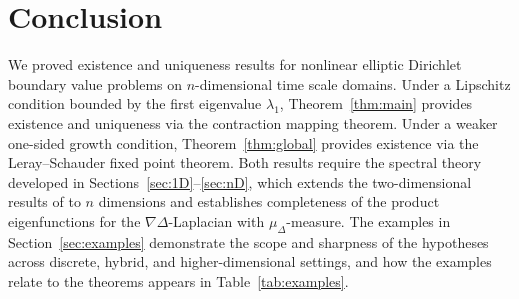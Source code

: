 \documentclass{article}
\numberwithin{equation}{section}
\numberwithin{theorem}{section}
\begin{document}

\section{Conclusion}
\label{sec:conclusion}
We proved existence and uniqueness results for nonlinear elliptic Dirichlet boundary value problems on $n$-dimensional time scale domains.
Under a Lipschitz condition bounded by the first eigenvalue $\lambda_1$, Theorem~\ref{thm:main} provides existence and uniqueness via the contraction mapping theorem. Under a weaker one-sided growth condition, Theorem~\ref{thm:global} provides existence via the Leray--Schauder fixed point theorem. Both results require the spectral theory developed in Sections~\ref{sec:1D}--\ref{sec:nD}, which extends the two-dimensional results of \cite{Huseynov-2009} to $n$ dimensions and establishes completeness of the product eigenfunctions for the $\nabla\Delta$-Laplacian with $\mu_\Delta$-measure. The examples in Section~\ref{sec:examples} demonstrate the scope and sharpness of the hypotheses across discrete, hybrid, and higher-dimensional settings, and how the examples relate to the theorems appears in Table~\ref{tab:examples}.
\end{document}
